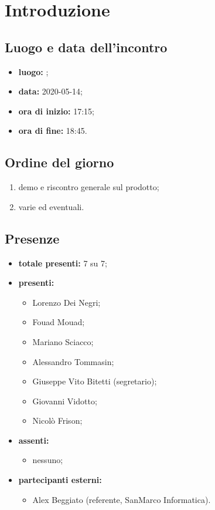 \section*{Introduzione}

\subsection*{Luogo e data dell'incontro}
	\begin{itemize}
		\item \textbf{luogo:} ;
		\item \textbf{data:} 2020-05-14;
		\item \textbf{ora di inizio:} 17:15;
		\item \textbf{ora di fine:} 18:45.
	\end{itemize}

\subsection*{Ordine del giorno}
	\begin{enumerate}
		\item demo e riscontro generale sul prodotto;
  		\item varie ed eventuali.
	\end{enumerate}

\subsection*{Presenze}
	\begin{itemize}
		\item \textbf{totale presenti:} 7 su 7;
		\item \textbf{presenti: }
			\begin{itemize}
				\item Lorenzo Dei Negri;
				\item Fouad Mouad;
				\item Mariano Sciacco;
				\item Alessandro Tommasin;
				\item Giuseppe Vito Bitetti (segretario);
				\item Giovanni Vidotto;
				\item Nicolò Frison;
			\end{itemize}
		\item \textbf{assenti: }
			\begin{itemize}
				\item nessuno;
			\end{itemize}
		\item  \textbf{partecipanti esterni:}
			\begin{itemize}
				\item Alex Beggiato (referente, SanMarco Informatica).
			\end{itemize}
	\end{itemize}


